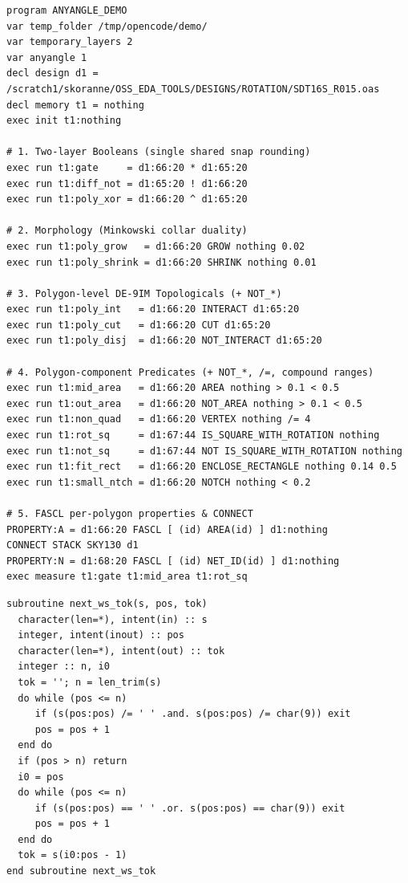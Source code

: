 \begin{lstlisting}[style=ctrstyle,caption={Complete \texttt{MAGPARSER} any-angle \texttt{.ctr} script demonstrating Booleans, morphology, topologicals, predicates, and FASCL.},label={lst:ctr_example}]
program ANYANGLE_DEMO
var temp_folder /tmp/opencode/demo/
var temporary_layers 2
var anyangle 1
decl design d1 = /scratch1/skoranne/OSS_EDA_TOOLS/DESIGNS/ROTATION/SDT16S_R015.oas
decl memory t1 = nothing
exec init t1:nothing

# 1. Two-layer Booleans (single shared snap rounding)
exec run t1:gate     = d1:66:20 * d1:65:20
exec run t1:diff_not = d1:65:20 ! d1:66:20
exec run t1:poly_xor = d1:66:20 ^ d1:65:20

# 2. Morphology (Minkowski collar duality)
exec run t1:poly_grow   = d1:66:20 GROW nothing 0.02
exec run t1:poly_shrink = d1:66:20 SHRINK nothing 0.01

# 3. Polygon-level DE-9IM Topologicals (+ NOT_*)
exec run t1:poly_int   = d1:66:20 INTERACT d1:65:20
exec run t1:poly_cut   = d1:66:20 CUT d1:65:20
exec run t1:poly_disj  = d1:66:20 NOT_INTERACT d1:65:20

# 4. Polygon-component Predicates (+ NOT_*, /=, compound ranges)
exec run t1:mid_area   = d1:66:20 AREA nothing > 0.1 < 0.5
exec run t1:out_area   = d1:66:20 NOT_AREA nothing > 0.1 < 0.5
exec run t1:non_quad   = d1:66:20 VERTEX nothing /= 4
exec run t1:rot_sq     = d1:67:44 IS_SQUARE_WITH_ROTATION nothing
exec run t1:not_sq     = d1:67:44 NOT IS_SQUARE_WITH_ROTATION nothing
exec run t1:fit_rect   = d1:66:20 ENCLOSE_RECTANGLE nothing 0.14 0.5
exec run t1:small_ntch = d1:66:20 NOTCH nothing < 0.2

# 5. FASCL per-polygon properties & CONNECT
PROPERTY:A = d1:66:20 FASCL [ (id) AREA(id) ] d1:nothing
CONNECT STACK SKY130 d1
PROPERTY:N = d1:68:20 FASCL [ (id) NET_ID(id) ] d1:nothing
exec measure t1:gate t1:mid_area t1:rot_sq
\end{lstlisting}

\begin{lstlisting}[caption={Whitespace-tokenized predicate argument parser (\texttt{AnyAngleParsePredArgs}) in \texttt{src/anyangle\_ops.f90} avoiding Fortran's \texttt{/} list-directed delimiter trap.},label={lst:arg_parser}]
subroutine next_ws_tok(s, pos, tok)
  character(len=*), intent(in) :: s
  integer, intent(inout) :: pos
  character(len=*), intent(out) :: tok
  integer :: n, i0
  tok = ''; n = len_trim(s)
  do while (pos <= n)
     if (s(pos:pos) /= ' ' .and. s(pos:pos) /= char(9)) exit
     pos = pos + 1
  end do
  if (pos > n) return
  i0 = pos
  do while (pos <= n)
     if (s(pos:pos) == ' ' .or. s(pos:pos) == char(9)) exit
     pos = pos + 1
  end do
  tok = s(i0:pos - 1)
end subroutine next_ws_tok
\end{lstlisting}
